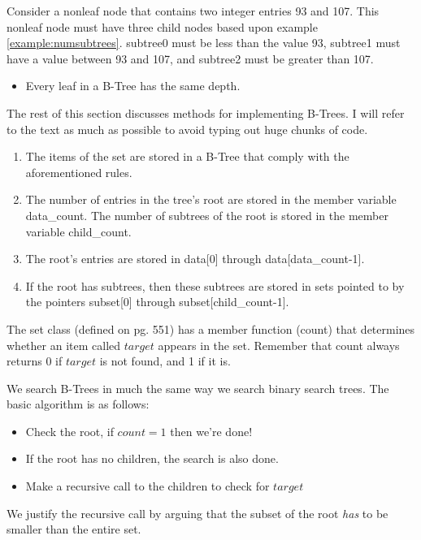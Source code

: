 \begin{example}
Consider a nonleaf node that contains two integer entries 93 and 107. This nonleaf node must have three child nodes based upon example \ref{example:numsubtrees}. subtree0 must be less than the value 93, subtree1 must have a value between 93 and 107, and subtree2 must be greater than 107.
\end{example}
\begin{itemize}
\item Every leaf in a B-Tree has the same depth.
\end{itemize}
The rest of this section discusses methods for implementing B-Trees. I will refer to the text as much as possible to avoid typing out huge chunks of code.

\begin{enumerate}
\item The items of the set are stored in a B-Tree that comply with the aforementioned rules.
\item The number of entries in the tree's root are stored in the member variable data\_count. The number of subtrees of the root is stored in the member variable child\_count.
\item The root's entries are stored in data[0] through data[data\_count-1].
\item If the root has subtrees, then these subtrees are stored in sets pointed to by the pointers subset[0] through subset[child\_count-1].
\end{enumerate}

The set class (defined on pg. 551) has a member function (count) that determines whether an item called $target$ appears in the set. Remember that count always returns 0 if $target$ is not found, and 1 if it is.

We search B-Trees in much the same way we search binary search trees. The basic algorithm is as follows:
\begin{itemize}
\item Check the root, if $count=1$ then we're done!
\item If the root has no children, the search is also done.
\item Make a recursive call to the children to check for $target$
\end{itemize}
We justify the recursive call by arguing that the subset of the root \emph{has} to be smaller than the entire set.

